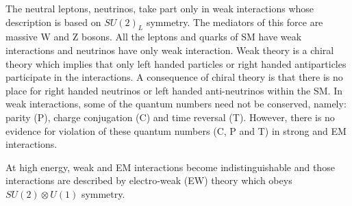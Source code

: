The neutral leptons, neutrinos, take part only in weak interactions whose description is based on $SU(2)_L$ symmetry. The mediators of 
this force are massive W and Z bosons. All the leptons and quarks of SM have weak interactions and neutrinos have only weak interaction. 
Weak theory is a chiral theory which implies that only left handed particles or right handed antiparticles participate in the 
interactions. A consequence of chiral theory is that there is no place for right handed neutrinos or left handed anti-neutrinos within the SM. 
In weak interactions, some of the quantum numbers need not be conserved, namely: parity (P), charge conjugation (C) and time reversal (T).
However, there is no evidence for violation of these quantum numbers (C, P and T) in strong and EM interactions.

At high energy, weak and EM interactions become indistinguishable and those interactions are described by electro-weak (EW) theory 
\cite{PhysRevLett.19.1264}\cite{Salam1959}\cite{Glashow:1959wxa} which obeys $SU(2)\otimes U(1)$ symmetry.

